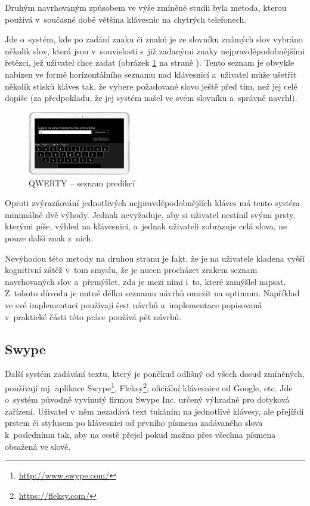 \documentclass[a4paper,11pt,openany]{book} %
\begin{document}
Druhým navrhovaným způsobem ve výše zmíněné studii byla metoda, kterou používá v~současné době většina klávesnic na chytrých telefonech.

Jde o~systém, kde po zadání znaku či znaků je ze slovníku známých slov vybráno několik slov, která jsou v~souvislosti s~již zadanými znaky nejpravděpodobnějšími řetězci, jež uživatel chce zadat (obrázek \ref{fig:qwerty-predict} na straně \pageref{fig:qwerty-predict}). Tento seznam je obvykle nabízen ve formě horizontálního seznamu nad klávesnicí a~uživatel může ušetřit několik stisků kláves tak, že vybere požadované slovo ještě před tím, než jej celé dopíše (za předpokladu, že jej systém našel ve svém slovníku a~správně navrhl). 

\begin{figure}[ht]
	\centering
	\includegraphics[width=0.4\textwidth]{qwerty_predict}
	\caption{QWERTY -- seznam predikcí}
	\label{fig:qwerty-predict}
\end{figure}

Oproti zvýrazňování jednotlivých nejpravděpodobnějších kláves má tento systém minimálně dvě výhody. Jednak nevyžaduje, aby si uživatel nestínil svými prsty, kterými píše, výhled na klávesnici, a~jednak uživateli zobrazuje celá slova, ne pouze další znak z~nich.

Nevýhodou této metody na druhou stranu je fakt, že je na uživatele kladena vyšší kognitivní zátěž v~tom smyslu, že je nucen procházet zrakem seznam navrhovaných slov a~přemýšlet, zda je mezi nimi i~to, které zamýšlel napsat. Z~tohoto důvodu je nutné délku seznamu návrhů omezit na optimum. Například \parencite{neverilovaulipova2014} ve své implementaci používají šest návrhů a~implementace popisovaná v~praktické části této práce používá pět návrhů.

\subsection{Swype}

Další systém zadávání textu, který je poněkud odlišný od všech dosud zmíněných, používají mj. aplikace Swype\footnote{\url{http://www.swype.com/}}, Fleksy\footnote{\url{https://fleksy.com/}}, oficiální klávesnice od Google, etc. Jde o~systém původně vyvinutý firmou Swype Inc. určený výhradně pro dotyková zařízení. Uživatel v~něm nezadává text ťukáním na jednotlivé klávesy, ale přejíždí prstem či stylusem po klávesnici od prvního písmena zadávaného slova k~poslednímu tak, aby na cestě přejel pokud možno přes všechna písmena obsažená ve slově. \parencite{swypeabout} %
\end{document}
